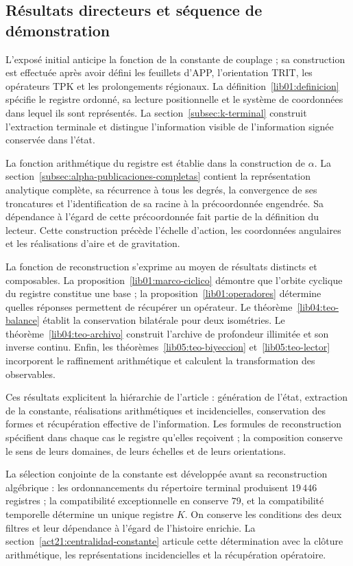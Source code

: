 \subsection*{Résultats directeurs et séquence de démonstration}
\label{paper:resultados-rectores}
L’exposé initial anticipe la fonction de la constante de couplage ;
sa construction est effectuée après avoir défini les feuillets d’APP,
l’orientation TRIT, les opérateurs TPK et les prolongements régionaux.
La définition~\ref{lib01:definicion} spécifie le registre ordonné, sa
lecture positionnelle et le système de coordonnées dans lequel ils sont représentés. La
section~\ref{subsec:k-terminal} construit l’extraction terminale et distingue
l’information visible de l’information signée conservée dans l’état.

La fonction arithmétique du registre est établie dans la construction de
\(\alpha\). La section~\ref{subsec:alpha-publicaciones-completas} contient
la représentation analytique complète, sa récurrence à tous les degrés,
la convergence de ses troncatures et l’identification de sa racine à la
précoordonnée engendrée. Sa dépendance à l’égard de cette précoordonnée fait partie de
la définition du lecteur. Cette construction précède l’échelle d’action,
les coordonnées angulaires et les réalisations d’aire et de gravitation.

La fonction de reconstruction s'exprime au moyen de résultats distincts et composables. La proposition~\ref{lib01:marco-ciclico} démontre que l'orbite cyclique du registre constitue une base ; la proposition~\ref{lib01:operadores} détermine quelles réponses permettent de récupérer un opérateur. Le théorème~\ref{lib04:teo-balance} établit la conservation bilatérale pour deux isométries. Le théorème~\ref{lib04:teo-archivo} construit l'archive de profondeur illimitée et son inverse continu. Enfin, les théorèmes~\ref{lib05:teo-biyeccion} et~\ref{lib05:teo-lector} incorporent le raffinement arithmétique et calculent la transformation des observables.

Ces résultats explicitent la hiérarchie de l’article : génération de
l’état, extraction de la constante, réalisations arithmétiques et
incidencielles, conservation des formes et récupération effective de
l’information. Les formules de reconstruction spécifient dans chaque cas le
registre qu’elles reçoivent ; la composition conserve le sens de leurs
domaines, de leurs échelles et de leurs orientations.

La sélection conjointe de la constante est développée avant sa
reconstruction algébrique : les ordonnancements du répertoire terminal produisent
\(19\,446\) registres ; la compatibilité exceptionnelle en conserve \(79\), et la
compatibilité temporelle détermine un unique registre \(K\). On conserve les
conditions des deux filtres et leur dépendance à l’égard de l’histoire enrichie.
La section~\ref{act21:centralidad-constante} articule cette détermination avec
la clôture arithmétique, les représentations incidencielles et la récupération
opératoire.
